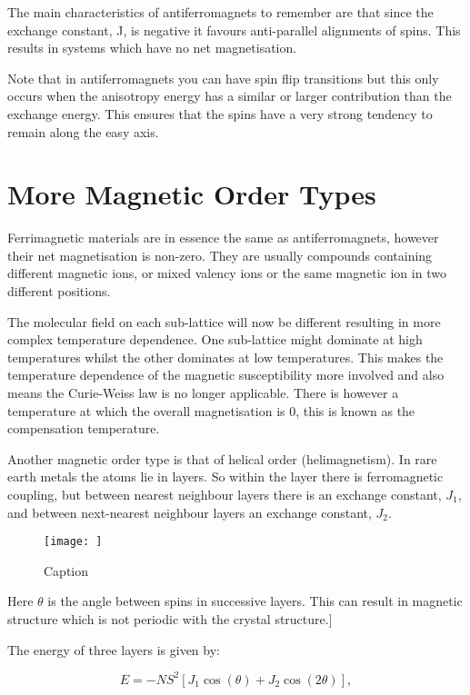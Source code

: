 \noindent The main characteristics of antiferromagnets to remember are that since the exchange constant, J, is negative it favours anti-parallel alignments of spins. This results in systems which have no net magnetisation.

\noindent Note that in antiferromagnets you can have spin flip transitions but this only occurs when the anisotropy energy has a similar or larger contribution than the exchange energy. This ensures that the spins have a very strong tendency to remain along the easy axis.

\section{More Magnetic Order Types}

Ferrimagnetic materials are in essence the same as antiferromagnets, however their net magnetisation is non-zero. They are usually compounds containing different magnetic ions, or mixed valency ions or the same magnetic ion in two different positions.

\noindent The molecular field on each sub-lattice will now be different resulting in more complex temperature dependence. One sub-lattice might dominate at high temperatures whilst the other dominates at low temperatures. This makes the temperature dependence of the magnetic susceptibility more involved and also means the Curie-Weiss law is no longer applicable. There is however a temperature at which the overall magnetisation is 0, this is known as the compensation temperature.

\noindent Another magnetic order type is that of helical order (helimagnetism). In rare earth metals the atoms lie in layers. So within the layer there is ferromagnetic coupling, but between nearest neighbour layers there is an exchange constant, $J_1$, and between next-nearest neighbour layers an exchange constant, $J_2$.

\begin{figure}
    \centering
    \texttt{[image: ]}
    \caption{Caption}
    \label{fig:enter-label}
\end{figure}

\noindent Here $\theta$ is the angle between spins in successive layers. This can result in magnetic structure which is not periodic with the crystal structure.]

\noindent The energy of three layers is given by:

\begin{equation}
    E = -NS^2[J_1 \cos(\theta) + J_2 \cos(2\theta)],
    \label{HelicalOrderEnergy}
\end{equation}

